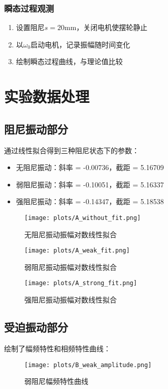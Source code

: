 \documentclass[UTF8]{ctexart}
\begin{document}
\subsubsection{瞬态过程观测}
\begin{enumerate}
\item 设置阻尼$s=20$mm，关闭电机使摆轮静止
\item 以$\omega_0$启动电机，记录振幅随时间变化
\item 绘制瞬态过程曲线，与理论值比较
\end{enumerate}

\section{实验数据处理}

\subsection{阻尼振动部分}
通过线性拟合得到三种阻尼状态下的参数：

\begin{itemize}
\item 无阻尼振动：斜率 = -0.00736，截距 = 5.16709
\item 弱阻尼振动：斜率 = -0.10051，截距 = 5.16337
\item 强阻尼振动：斜率 = -0.14347，截距 = 5.18538
\end{itemize}

\begin{figure}[H]
\centering
\texttt{[image: plots/A\_without\_fit.png]}
\caption{无阻尼振动振幅对数线性拟合}
\end{figure}

\begin{figure}[H]
\centering
\texttt{[image: plots/A\_weak\_fit.png]}
\caption{弱阻尼振动振幅对数线性拟合}
\end{figure}

\begin{figure}[H]
\centering
\texttt{[image: plots/A\_strong\_fit.png]}
\caption{强阻尼振动振幅对数线性拟合}
\end{figure}

\subsection{受迫振动部分}
绘制了幅频特性和相频特性曲线：

\begin{figure}[H]
\centering
\texttt{[image: plots/B\_weak\_amplitude.png]}
\caption{弱阻尼幅频特性曲线}
\end{figure}
\end{document}
